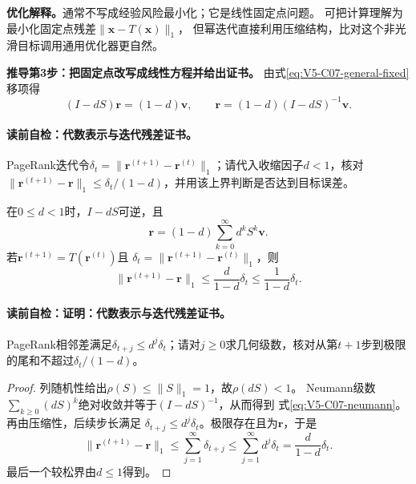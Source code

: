 \label{struct:V5-C07-CH16}
\textbf{优化解释。}\PageRank{}通常不写成经验风险最小化；它是线性固定点问题。
可把计算理解为最小化固定点残差$\|\boldsymbol x-T(\boldsymbol x)\|_1$，
但幂迭代直接利用压缩结构，比对这个非光滑目标调用通用优化器更自然。

\textbf{推导第3步：把固定点改写成线性方程并给出证书。}
由式\eqref{eq:V5-C07-general-fixed}移项得
\begin{equation}
(I-dS)\boldsymbol r=(1-d)\boldsymbol v,\qquad
\boldsymbol r=(1-d)(I-dS)^{-1}\boldsymbol v.
\label{eq:V5-C07-linear-system}
\end{equation}
\paragraph{读前自检：代数表示与迭代残差证书。}PageRank迭代令$\delta_t=\lVert\boldsymbol r^{(t+1)}-\boldsymbol r^{(t)}\rVert_1$；请代入收缩因子$d<1$，核对$\lVert\boldsymbol r^{(t+1)}-\boldsymbol r\rVert_1\le\delta_t/(1-d)$，并用该上界判断是否达到目标误差。\par

\begin{proposition}[代数表示与迭代残差证书]\label{prop:V5-C07-linear-residual}
在$0\le d<1$时，$I-dS$可逆，且
\begin{equation}
\boldsymbol r=(1-d)\sum_{k=0}^{\infty}d^kS^k\boldsymbol v.
\label{eq:V5-C07-neumann}
\end{equation}
若$\boldsymbol r^{(t+1)}=T(\boldsymbol r^{(t)})$且
$\delta_t=\|\boldsymbol r^{(t+1)}-\boldsymbol r^{(t)}\|_1$，则
\begin{equation}
\|\boldsymbol r^{(t+1)}-\boldsymbol r\|_1
\le\frac{d}{1-d}\delta_t
\le\frac{1}{1-d}\delta_t.
\label{eq:V5-C07-residual-certificate}
\end{equation}
\end{proposition}
\paragraph{读前自检：证明：代数表示与迭代残差证书。}PageRank相邻差满足$\delta_{t+j}\le d^j\delta_t$；请对$j\ge0$求几何级数，核对从第$t+1$步到极限的尾和不超过$\delta_t/(1-d)$。\par

\begin{proof}
列随机性给出$\rho(S)\le\|S\|_1=1$，故$\rho(dS)<1$。
Neumann级数$\sum_{k\ge0}(dS)^k$绝对收敛并等于$(I-dS)^{-1}$，从而得到
式\eqref{eq:V5-C07-neumann}。再由压缩性，后续步长满足
$\delta_{t+j}\le d^j\delta_t$。极限存在且为$\boldsymbol r$，于是
\[
\|\boldsymbol r^{(t+1)}-\boldsymbol r\|_1
\le\sum_{j=1}^{\infty}\delta_{t+j}
\le\sum_{j=1}^{\infty}d^j\delta_t
=\frac{d}{1-d}\delta_t.
\]
最后一个较松界由$d\le1$得到。
\end{proof}

